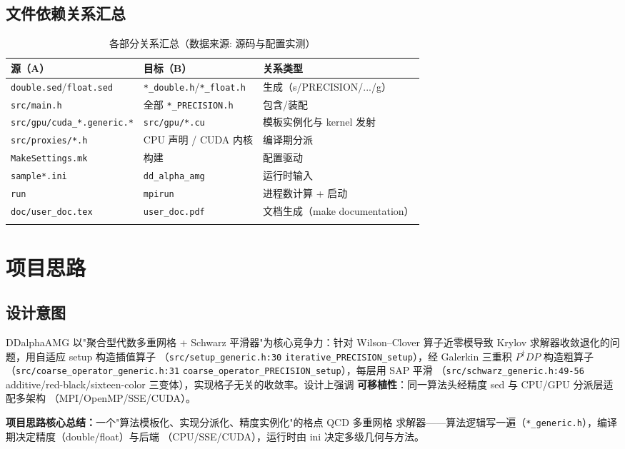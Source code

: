 \documentclass[UTF8]{ctexart}
\begin{document}
\subsection{文件依赖关系汇总}
\begin{xltabular}{\textwidth}{llX}
\toprule
\textcolor{relation}{源（A）} & 目标（B） & 关系类型 \\
\midrule
\endhead
\texttt{double.sed}/\texttt{float.sed} & \texttt{*\_double.h}/\texttt{*\_float.h} & 生成（s/PRECISION/.../g）\\
\texttt{src/main.h} & 全部 \texttt{*\_PRECISION.h} & 包含/装配 \\
\texttt{src/gpu/cuda\_*.generic.*} & \texttt{src/gpu/*.cu} & 模板实例化与 kernel 发射 \\
\texttt{src/proxies/*.h} & CPU 声明 / CUDA 内核 & 编译期分派 \\
\texttt{MakeSettings.mk} & 构建 & 配置驱动 \\
\texttt{sample*.ini} & \texttt{dd\_alpha\_amg} & 运行时输入 \\
\texttt{run} & \texttt{mpirun} & 进程数计算 + 启动 \\
\texttt{doc/user\_doc.tex} & \texttt{user\_doc.pdf} & 文档生成（make documentation）\\
\bottomrule
\caption{各部分关系汇总（数据来源: 源码与配置实测）}
\end{xltabular}

\section{项目思路}

\subsection{设计意图}
DDalphaAMG 以"聚合型代数多重网格 + Schwarz 平滑器"为核心竞争力：针对 Wilson--Clover
算子近零模导致 Krylov 求解器收敛退化的问题，用自适应 setup 构造插值算子
（\texttt{\nolinkurl{src/setup_generic.h:30}} \texttt{iterative\_PRECISION\_setup}），经
Galerkin 三重积 $P^\dagger D P$ 构造粗算子（\texttt{\nolinkurl{src/coarse_operator_generic.h:31}}
\texttt{coarse\_operator\_PRECISION\_setup}），每层用 SAP 平滑
（\texttt{\nolinkurl{src/schwarz_generic.h:49-56}}
additive/red-black/sixteen-color 三变体），实现格子无关的收敛率。设计上强调
\textbf{可移植性}：同一算法头经精度 sed 与 CPU/GPU 分派层适配多架构
（MPI/OpenMP/SSE/CUDA）。

\begin{ideabox}
\textbf{项目思路核心总结：}一个"算法模板化、实现分派化、精度实例化"的格点 QCD 多重网格
求解器——算法逻辑写一遍（\texttt{*\_generic.h}），编译期决定精度（double/float）与后端
（CPU/SSE/CUDA），运行时由 ini 决定多级几何与方法。
\end{ideabox}
\end{document}
